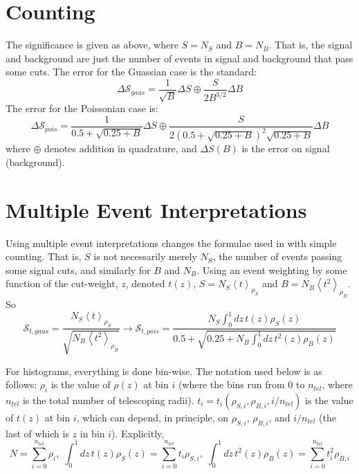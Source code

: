 \section{Counting}
The significance is given as above, where $S=N_S$ and $B=N_B$.  That is, the signal and background are just the number of events in signal and background that pass some cuts.  The error for the Guassian case is the standard:
\begin{equation}
\Delta\mathscr{S}_{gaus}=\frac{1}{\sqrt{B}}\Delta S\oplus\frac{S}{2B^{3/2}}\Delta B
\end{equation}
The error for the Poissonian case is:
\begin{equation}
\Delta\mathscr{S}_{pois}=\frac{1}{0.5+\sqrt{0.25+B}}\Delta S\oplus\frac{S}{2\left(0.5+\sqrt{0.25+B}\right)^2\sqrt{0.25+B}}\Delta B
\end{equation}
where $\oplus$ denotes addition in quadrature, and $\Delta S (B)$ is the error on signal (background).

\section{Multiple Event Interpretations}
Using multiple event interpretations changes the formulae used in with simple counting.  That is, $S$ is not necessarily merely $N_S$, the number of events passing some signal cuts, and similarly for $B$ and $N_B$.  Using an event weighting by some function of the cut-weight, $z$, denoted $t\left(z\right)$, $S=N_S\left<t\right>_{\rho_S}$ and $B=N_B\left<t^2\right>_{\rho_B}$. So
\begin{equation}
\mathscr{S}_{t,gaus}=\frac{N_S\left<t\right>_{\rho_S}}{\sqrt{N_B\left<t^2\right>_{\rho_B}}}\to\mathscr{S}_{t,pois}=\frac{N_S\int_0^1 dz\,t\left(z\right)\rho_S\left(z\right)}{0.5+\sqrt{0.25+N_B\int_0^1dz\,t^2\left(z\right)\rho_B\left(z\right)}}
\end{equation}

For histograms, everything is done bin-wise.  The notation used below is as follows: $\rho_i$ is the value of $\rho\left(z\right)$ at bin $i$ (where the bins run from 0 to $n_{tel}$, where $n_{tel}$ is the total number of telescoping radii).  $t_i=t_i\left(\rho_{S,i},\rho_{B,i},i/n_{tel}\right)$ is the value of $t\left(z\right)$ at bin $i$, which can depend, in principle, on $\rho_{S,i}$, $\rho_{B,i}$, and $i/n_{tel}$ (the last of which is $z$ in bin $i$).  Explicitly,
\begin{equation*}
N=\sum_{i=0}^{n_{tel}} \rho_i,\;\int_0^1 dz\,t\left(z\right)\rho_S\left(z\right)=\sum_{i=0}^{n_{tel}}t_i\rho_{S,i},\;\int_0^1 dz\,t^2\left(z\right)\rho_B\left(z\right)=\sum_{i=0}^{n_{tel}}t^2_i\rho_{B,i}
\end{equation*}

